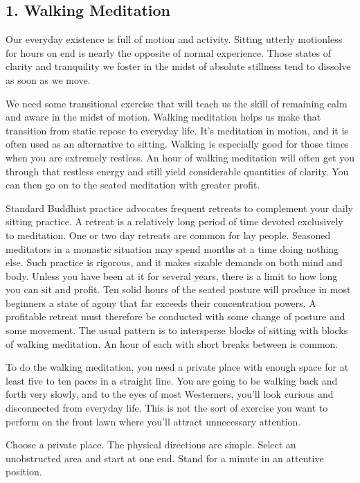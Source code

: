 \subsection*{1. Walking Meditation} Our everyday existence is full of motion and activity.
Sitting utterly motionless for hours on end is nearly the opposite of normal
experience. Those states of clarity and tranquility we foster in the midst of
absolute stillness tend to dissolve as soon as we move.

We need some transitional exercise that will teach us the skill of remaining
calm and aware in the midst of motion. Walking meditation helps us make that
transition from static repose to everyday life. It's meditation in motion, and
it is often used as an alternative to sitting. Walking is especially good for
those times when you are extremely restless. An hour of walking meditation will
often get you through that restless energy and still yield considerable
quantities of clarity. You can then go on to the seated meditation with greater
profit.

Standard Buddhist practice advocates frequent retreats to complement your daily
sitting practice. A retreat is a relatively long period of time devoted
exclusively to meditation. One or two day retreats are common for lay people.
Seasoned meditators in a monastic situation may spend months at a time doing
nothing else. Such practice is rigorous, and it makes sizable demands on both
mind and body. Unless you have been at it for several years, there is a limit to
how long you can sit and profit. Ten solid hours of the seated posture will
produce in most beginners a state of agony that far exceeds their concentration
powers. A profitable retreat must therefore be conducted with some change of
posture and some movement. The usual pattern is to intersperse blocks of sitting
with blocks of walking meditation. An hour of each with short breaks between is
common.

To do the walking meditation, you need a private place with enough space for at
least five to ten paces in a straight line. You are going to be walking back and
forth very slowly, and to the eyes of most Westerners, you'll look curious and
disconnected from everyday life. This is not the sort of exercise you want to
perform on the front lawn where you'll attract unnecessary attention.

Choose a private place.
The physical directions are simple. Select an unobstructed area and start at one end. Stand for a minute in an attentive position.

